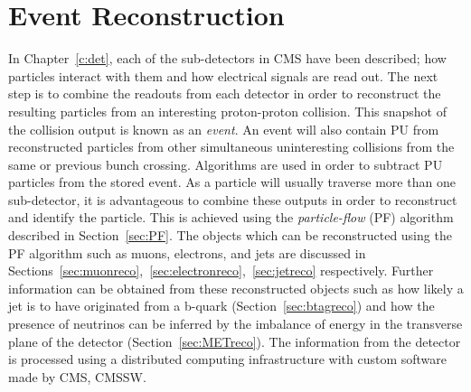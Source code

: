 \chapter{Event Reconstruction}
\label{c:recon}


In Chapter~\ref{c:det}, each of the sub-detectors in CMS have been described; how particles interact with them and how electrical signals are read out. The next step is to combine the readouts from each detector in order to reconstruct the resulting particles from an interesting proton-proton collision. This snapshot of the collision output is known as an \emph{event}. An event will also contain PU from reconstructed particles from other simultaneous uninteresting collisions from the same or previous bunch crossing. Algorithms are used in order to subtract PU particles from the stored event. 
As a particle will usually traverse more than one sub-detector, it is advantageous to combine these outputs in order to reconstruct and identify the particle. This is achieved using the \emph{particle-flow} (PF) algorithm described in Section~\ref{sec:PF}. The objects which can be reconstructed using the PF algorithm such as muons, electrons, and jets are discussed in Sections~\ref{sec:muonreco},~\ref{sec:electronreco},~\ref{sec:jetreco} respectively. Further information can be obtained from these reconstructed objects such as how likely a jet is to have originated from a b-quark (Section~\ref{sec:btagreco}) and how the presence of neutrinos can be inferred by the imbalance of energy in the transverse plane of the detector (Section~\ref{sec:METreco}).  
The information from the detector is processed using a distributed computing infrastructure with custom software made by CMS, CMSSW.




